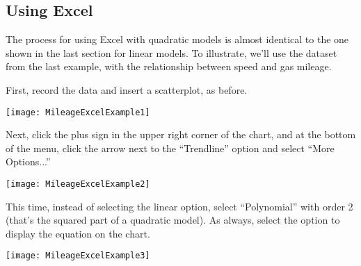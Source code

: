 \subsection{Using Excel}
The process for using Excel with quadratic models is almost identical to the one shown in the last section for linear models.  To illustrate, we'll use the dataset from the last example, with the relationship between speed and gas mileage.

First, record the data and insert a scatterplot, as before.
\begin{center}
\texttt{[image: MileageExcelExample1]}
\end{center}

Next, click the plus sign in the upper right corner of the chart, and at the bottom of the menu, click the arrow next to the ``Trendline'' option and select ``More Options...''
\begin{center}
\texttt{[image: MileageExcelExample2]}
\end{center}

This time, instead of selecting the linear option, select ``Polynomial'' with order 2 (that's the squared part of a quadratic model).  As always, select the option to display the equation on the chart.
\begin{center}
\texttt{[image: MileageExcelExample3]}
\end{center}